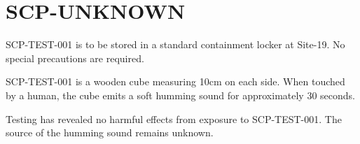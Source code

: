\section{SCP-UNKNOWN}


\containment

SCP-TEST-001 is to be stored in a standard containment locker at Site-19. No special precautions are required.

\scpdescription

SCP-TEST-001 is a wooden cube measuring 10cm on each side. When touched by a human, the cube emits a soft humming sound for approximately 30 seconds.

Testing has revealed no harmful effects from exposure to SCP-TEST-001. The source of the humming sound remains unknown.

